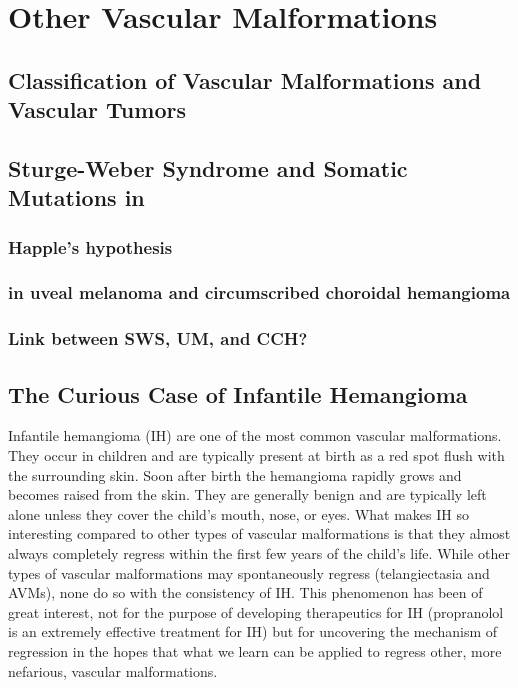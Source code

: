 \section{Other Vascular Malformations}
\subsection{Classification of Vascular Malformations and Vascular Tumors}

\subsection{Sturge-Weber Syndrome and Somatic Mutations in }
\subsubsection{Happle's hypothesis}
\subsubsection{ in uveal melanoma and circumscribed choroidal hemangioma}
\subsubsection{Link between SWS, UM, and CCH?}

\subsection{The Curious Case of Infantile Hemangioma}
Infantile hemangioma (IH) are one of the most common vascular malformations. They occur in children and are typically present at birth as a red spot flush with the surrounding skin. Soon after birth the hemangioma rapidly grows and becomes raised from the skin. They are generally benign and are typically left alone unless they cover the child's mouth, nose, or eyes. What makes IH so interesting compared to other types of vascular malformations is that they almost always completely regress within the first few years of the child's life. While other types of vascular malformations may spontaneously regress (telangiectasia and AVMs), none do so with the consistency of IH. This phenomenon has been of great interest, not for the purpose of developing therapeutics for IH (propranolol is an extremely effective treatment for IH) but for uncovering the mechanism of regression in the hopes that what we learn can be applied to regress other, more nefarious, vascular malformations. 

